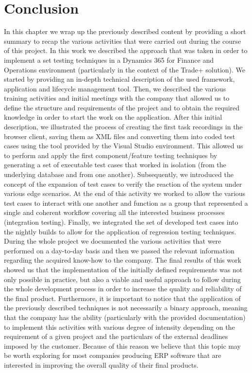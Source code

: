 
\chapter{Conclusion}

In this chapter we wrap up the previously described content by providing a short summary to recap the various activities that were carried out during the course of this project. 
In this work we described the approach that was taken in order to implement a set testing techniques in a Dynamics 365 for Finance and Operations environment (particularly in the context of the Trade+ solution). 
We started by providing an in-depth technical description of the used framework, application and lifecycle management tool. 
Then, we described the various training activities and initial meetings with the company that allowed us to define the structure and requirements of the project and to obtain the required knowledge in order to start the work on the application. 
After this initial description, we illustrated the process of creating the first task recordings in the browser client, saving them as XML files and converting them into coded test cases using the tool provided by the Visual Studio environment. 
This allowed us to perform and apply the first component/feature testing techniques by generating a set of executable test cases that worked in isolation (from the underlying database and from one another). 
Subsequently, we introduced the concept of the expansion of test cases to verify the reaction of the system under various edge scenarios. At the end of this activity we worked to allow the various test cases to interact with one another and function as a group that represented a single and coherent workflow covering all the interested business processes (integration testing).  
Finally, we integrated the set of developed test cases into the nightly builds to allow for the application of regression testing techniques. 
During the whole project we documented the various activities that were performed on a day-to-day basis and then we passed the relevant information regarding the acquired know-how to the company. 
The final results of this work showed us that the implementation of the initially defined requirements was not only possible in practice, but also a viable and useful approach to follow during the whole development process in order to increase the quality and reliability of the final product. 
Furthermore, it is important to notice that the application of the previously described techniques is not necessarily a binary approach, meaning that the company has the ability (particularly with the provided documentation) to implement this activities with various degree of intensity depending on the requirement of a given project and the particulars of the external deadlines imposed by the customer. 
Because of this reason we believe that this topic may be worth exploring for most companies producing ERP software that are interested in improving the overall quality of their final products.


